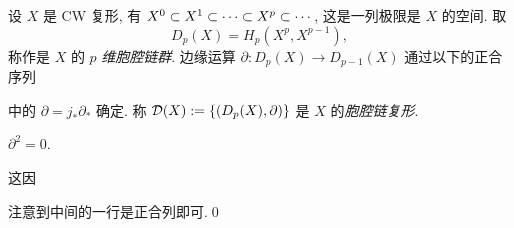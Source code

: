 \begin{Definition}[胞腔链复形]
	设 $ X $ 是 CW 复形, 有 $ X^0\subset X^1\subset\dots\subset X^p\subset\cdots $, 这是一列极限是 $ X $ 的空间. 取
	\[
		D_p(X)=H_p(X^p,X^{p-1}),
	\]
	称作是 $ X $ 的 $ p $ \emph{维胞腔链群}. 边缘运算 $ \partial : D_p(X)\to D_{p-1}(X) $ 通过以下的正合序列
	\begin{center}
	\end{center}
	中的 $ \partial=j_*\partial_* $ 确定. 称 $ \mathcal{D}(X):=\left\{ (D_p(X),\partial) \right\} $ 是 $ X $ 的\emph{胞腔链复形}.
\end{Definition}

\begin{Proposition}
	$ \partial^2=0 $.
\end{Proposition}
\begin{Proof}
	这因
	\begin{center}
	\end{center}
	注意到中间的一行是正合列即可.\qed
\end{Proof}


